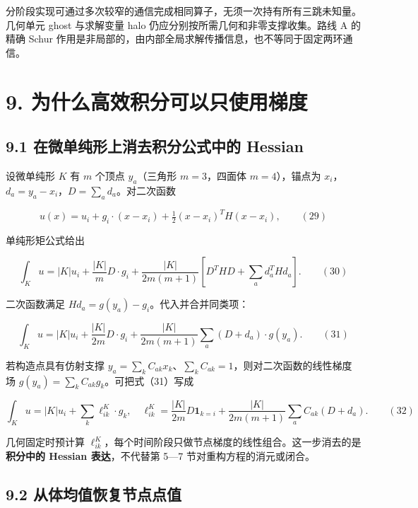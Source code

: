 \documentclass[
  11pt,
  a4paper,
]{article}
\begin{document}
分阶段实现可通过多次较窄的通信完成相同算子，无须一次持有所有三跳未知量。几何单元
ghost 与求解变量 halo 仍应分别按所需几何和非零支撑收集。路线 A 的精确
Schur 作用是非局部的，由内部全局求解传播信息，也不等同于固定两环通信。

\hypertarget{ux4e3aux4ec0ux4e48ux9ad8ux6548ux79efux5206ux53efux4ee5ux53eaux4f7fux7528ux68afux5ea6}{%
\section{9.
为什么高效积分可以只使用梯度}\label{ux4e3aux4ec0ux4e48ux9ad8ux6548ux79efux5206ux53efux4ee5ux53eaux4f7fux7528ux68afux5ea6}}

\hypertarget{ux5728ux5faeux5355ux7eafux5f62ux4e0aux6d88ux53bbux79efux5206ux516cux5f0fux4e2dux7684-hessian}{%
\subsection{9.1 在微单纯形上消去积分公式中的
Hessian}\label{ux5728ux5faeux5355ux7eafux5f62ux4e0aux6d88ux53bbux79efux5206ux516cux5f0fux4e2dux7684-hessian}}

设微单纯形 \(K\) 有 \(m\) 个顶点 \(y_a\)（三角形 \(m=3\)，四面体
\(m=4\)），锚点为 \(x_i\)，\(d_a=y_a-x_i\)，\(D=\sum_a d_a\)。对二次函数

\[
u(x)=u_i+g_i\cdot(x-x_i)+\tfrac12(x-x_i)^TH(x-x_i), \qquad(29)
\]

单纯形矩公式给出

\[
\int_Ku=|K|u_i+\frac{|K|}{m}D\cdot g_i
+\frac{|K|}{2m(m+1)}\left[D^THD+\sum_a d_a^THd_a\right]. \qquad(30)
\]

二次函数满足 \(Hd_a=g(y_a)-g_i\)。代入并合并同类项：

\[
\int_Ku=|K|u_i+\frac{|K|}{2m}D\cdot g_i
+\frac{|K|}{2m(m+1)}\sum_a(D+d_a)\cdot g(y_a). \qquad(31)
\]

若构造点具有仿射支撑
\(y_a=\sum_k C_{ak}x_k\)、\(\sum_kC_{ak}=1\)，则对二次函数的线性梯度场
\(g(y_a)=\sum_kC_{ak}g_k\)。可把式（31）写成

\[
\int_Ku=|K|u_i+\sum_k\ell_{ik}^K\cdot g_k,\quad
\ell_{ik}^K=\frac{|K|}{2m}D\mathbf1_{k=i}
+\frac{|K|}{2m(m+1)}\sum_a C_{ak}(D+d_a). \qquad(32)
\]

几何固定时预计算
\(\ell_{ik}^K\)，每个时间阶段只做节点梯度的线性组合。这一步消去的是\textbf{积分中的
Hessian 表达}，不代替第 5---7 节对重构方程的消元或闭合。

\hypertarget{ux4eceux4f53ux5747ux503cux6062ux590dux8282ux70b9ux70b9ux503c}{%
\subsection{9.2
从体均值恢复节点点值}\label{ux4eceux4f53ux5747ux503cux6062ux590dux8282ux70b9ux70b9ux503c}}
\end{document}

